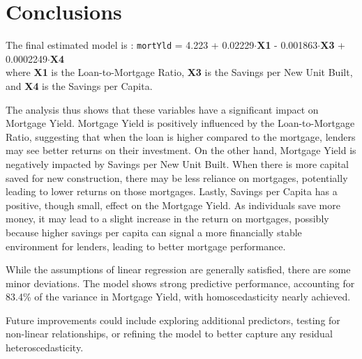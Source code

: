 \documentclass[
  11pt,
]{article}
\begin{document}
\vspace{-3em}

\section{Conclusions}\label{conclusions}

The final estimated model is : \texttt{mortYld} = 4.223 +
0.02229\(\cdot\)\textbf{X1} - 0.001863\(\cdot\)\textbf{X3} +
0.0002249\(\cdot\)\textbf{X4}\\
where \textbf{X1} is the Loan-to-Mortgage Ratio, \textbf{X3} is the
Savings per New Unit Built, and \textbf{X4} is the Savings per Capita.

The analysis thus shows that these variables have a significant impact
on Mortgage Yield. Mortgage Yield is positively influenced by the
Loan-to-Mortgage Ratio, suggesting that when the loan is higher compared
to the mortgage, lenders may see better returns on their investment. On
the other hand, Mortgage Yield is negatively impacted by Savings per New
Unit Built. When there is more capital saved for new construction, there
may be less reliance on mortgages, potentially leading to lower returns
on those mortgages. Lastly, Savings per Capita has a positive, though
small, effect on the Mortgage Yield. As individuals save more money, it
may lead to a slight increase in the return on mortgages, possibly
because higher savings per capita can signal a more financially stable
environment for lenders, leading to better mortgage performance.

While the assumptions of linear regression are generally satisfied,
there are some minor deviations. The model shows strong predictive
performance, accounting for 83.4\% of the variance in Mortgage Yield,
with homoscedasticity nearly achieved.

Future improvements could include exploring additional predictors,
testing for non-linear relationships, or refining the model to better
capture any residual heteroscedasticity.
\end{document}
